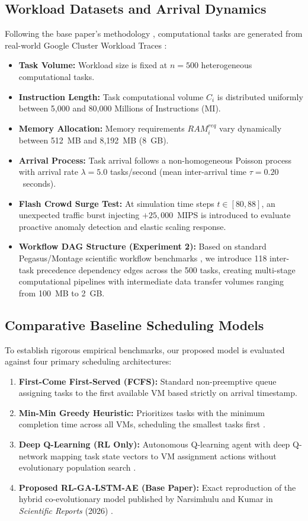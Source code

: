 \documentclass[default,sn-mathphys-num]{sn-jnl}
\theoremstyle{thmstyleone}
\theoremstyle{thmstyletwo}
\theoremstyle{thmstylethree}
\begin{document}
\subsection{Workload Datasets and Arrival Dynamics}
Following the base paper's methodology \cite{narsimhulu2026hybrid}, computational tasks are generated from real-world Google Cluster Workload Traces \cite{reiss2012towards}:
\begin{itemize}
    \item \textbf{Task Volume:} Workload size is fixed at $n = 500$ heterogeneous computational tasks.
    \item \textbf{Instruction Length:} Task computational volume $C_i$ is distributed uniformly between 5,000 and 80,000 Millions of Instructions (MI).
    \item \textbf{Memory Allocation:} Memory requirements $RAM_i^{req}$ vary dynamically between 512~MB and 8,192~MB (8~GB).
    \item \textbf{Arrival Process:} Task arrival follows a non-homogeneous Poisson process with arrival rate $\lambda = 5.0$ tasks/second (mean inter-arrival time $\tau = 0.20$~seconds).
    \item \textbf{Flash Crowd Surge Test:} At simulation time steps $t \in [80, 88]$, an unexpected traffic burst injecting $+25,000$~MIPS is introduced to evaluate proactive anomaly detection and elastic scaling response.
    \item \textbf{Workflow DAG Structure (Experiment 2):} Based on standard Pegasus/Montage scientific workflow benchmarks \cite{da2012workflow}, we introduce 118 inter-task precedence dependency edges across the 500 tasks, creating multi-stage computational pipelines with intermediate data transfer volumes ranging from 100~MB to 2~GB.
\end{itemize}

\subsection{Comparative Baseline Scheduling Models}
To establish rigorous empirical benchmarks, our proposed model is evaluated against four primary scheduling architectures:
\begin{enumerate}
    \item \textbf{First-Come First-Served (FCFS):} Standard non-preemptive queue assigning tasks to the first available VM based strictly on arrival timestamp.
    \item \textbf{Min-Min Greedy Heuristic:} Prioritizes tasks with the minimum completion time across all VMs, scheduling the smallest tasks first \cite{kumar2020energy}.
    \item \textbf{Deep Q-Learning (RL Only):} Autonomous Q-learning agent with deep Q-network mapping task state vectors to VM assignment actions without evolutionary population search \cite{mnih2015human}.
    \item \textbf{Proposed RL-GA-LSTM-AE (Base Paper):} Exact reproduction of the hybrid co-evolutionary model published by Narsimhulu and Kumar in \textit{Scientific Reports} (2026) \cite{narsimhulu2026hybrid}.
\end{enumerate}
\end{document}
